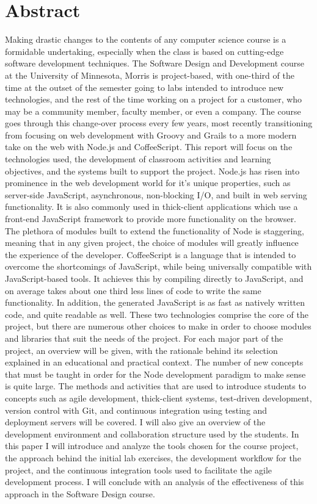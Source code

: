 \documentclass[12pt]{article}
\begin{document}
\section*{\centering Abstract}
Making drastic changes to the contents of any computer science course is a formidable undertaking, especially when the class is based on cutting-edge software development techniques. The Software Design and Development course at the University of Minnesota, Morris is project-based, with one-third of the time at the outset of the semester going to labs intended to introduce new technologies, and the rest of the time working on a project for a customer, who may be a community member, faculty member, or even a company. The course goes through this change-over process every few years, most recently transitioning from focusing on web development with Groovy and Grails to a more modern take on the web with Node.js and CoffeeScript. This report will focus on the technologies used, the development of classroom activities and learning objectives, and the systems built to support the project.
	Node.js has risen into prominence in the web development world for it’s unique properties, such as server-side JavaScript, asynchronous, non-blocking I/O, and built in web serving functionality. It is also commonly used in thick-client applications which use a front-end JavaScript framework to provide more functionality on the browser. The plethora of modules built to extend the functionality of Node is staggering, meaning that in any given project, the choice of modules will greatly influence the experience of the developer.
	CoffeeScript is a language that is intended to overcome the shortcomings of JavaScript, while being universally compatible with JavaScript-based tools. It achieves this by compiling directly to JavaScript, and on average takes about one third less lines of code to write the same functionality. In addition, the generated JavaScript is as fast as natively written code, and quite readable as well.
	These two technologies comprise the core of the project, but there are numerous other choices to make in order to choose modules and libraries that suit the needs of the project. For each major part of the project, an overview will be given, with the rationale behind its selection explained in an educational and practical context.
	The number of new concepts that must be taught in order for the Node development paradigm to make sense is quite large. The methods and activities that are used to introduce students to concepts such as agile development, thick-client systems, test-driven development, version control with Git, and continuous integration using testing and deployment servers will be covered. I will also give an overview of the development environment and collaboration structure used by the students.
	In this paper I will introduce and analyze the tools chosen for the course project, the approach behind the initial lab exercises, the development workflow for the project, and the continuous integration tools used to facilitate the agile development process. I will conclude with an analysis of the effectiveness of this approach in the Software Design course.
\end{document}
